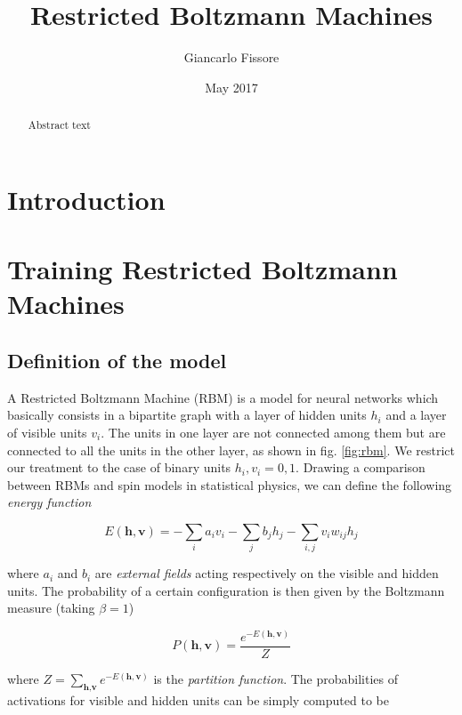 \documentclass{revtex4-1}
\begin{document}
\title{Restricted Boltzmann Machines}
\author{Giancarlo Fissore}
\date{May 2017}

\begin{abstract}
  Abstract text
\end{abstract}

\maketitle

\section{Introduction}

\section{Training Restricted Boltzmann Machines} \label{training}

\subsection{Definition of the model}

A Restricted Boltzmann Machine (RBM) is a model for neural networks which basically consists in a bipartite graph with a layer of hidden units \(h_i\) and a layer of visible units \(v_i\). The units in one layer are not connected among them but are connected to all the units in the other layer, as shown in fig. \ref{fig:rbm}. We restrict our treatment to the case of binary units \(h_i,v_i = 0,1\). Drawing a comparison between RBMs and spin models in statistical physics, we can define the following \textit{energy function}

\begin{equation}
E(\textbf{h},\textbf{v}) = - \sum_i a_i v_i - \sum_j b_j h_j - \sum_{i,j} v_i w_{ij} h_j
\label{eq:ef}
\end{equation}

where \(a_i\) and \(b_i\) are \textit{external fields} acting respectively on the visible and hidden units. The probability of a certain configuration is then given by the Boltzmann measure (taking \(\beta = 1\))

\begin{equation}
P(\textbf{h},\textbf{v}) = \frac{e^{-E(\textbf{h},\textbf{v})}}{Z}
\end{equation}

where \( \textstyle Z = \sum_{\textbf{h},\textbf{v}} e^{-E(\textbf{h},\textbf{v})}\) is the \textit{partition function}. The probabilities of activations for visible and hidden units can be simply computed to be
\end{document}
